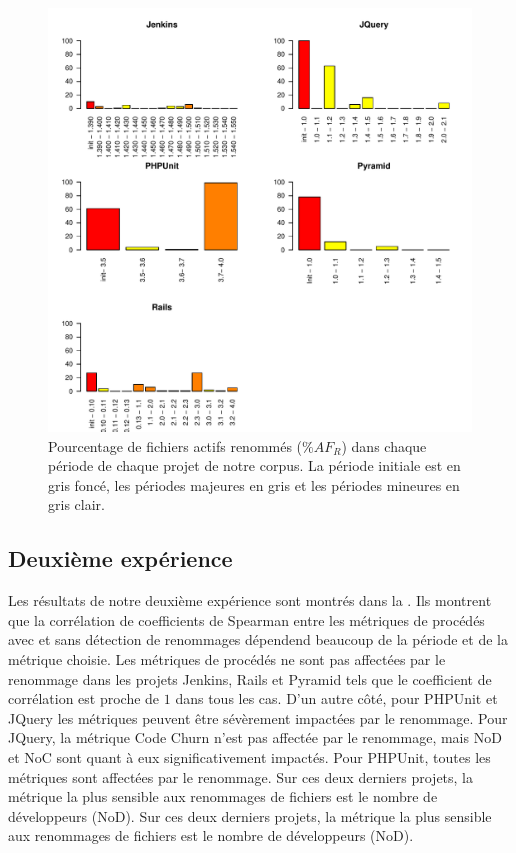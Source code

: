\begin{figure}[h]
	\centering
	\includegraphics[width=0.85\linewidth,keepaspectratio]{data/figures/renaming2.pdf}
	\caption{Pourcentage de fichiers actifs renommés ($\%AF_R$) dans chaque période de chaque projet de notre corpus. La période initiale est en gris foncé, les périodes majeures en gris et les périodes mineures en gris clair.}
	\label{fig:renaming2}
\end{figure}

\subsection{Deuxième expérience}
Les résultats de notre deuxième expérience sont montrés dans la . Ils montrent que la corrélation de coefficients de Spearman entre les métriques de procédés avec et sans détection de renommages dépendend beaucoup de la période et de la métrique choisie. Les métriques de procédés ne sont pas affectées par le renommage dans les projets Jenkins, Rails et Pyramid tels que le coefficient de corrélation est proche de $1$ dans tous les cas. D'un autre côté, pour PHPUnit et JQuery les métriques peuvent être sévèrement impactées par le renommage. Pour JQuery, la métrique Code Churn n'est pas affectée par le renommage, mais NoD et NoC sont quant à eux significativement impactés. Pour PHPUnit, toutes les métriques sont affectées par le renommage. Sur ces deux derniers projets, la métrique la plus sensible aux renommages de fichiers est le nombre de développeurs (NoD). Sur ces deux derniers projets, la métrique la plus sensible aux renommages de fichiers est le nombre de développeurs (NoD).


